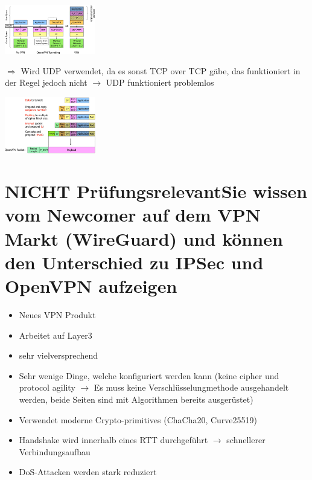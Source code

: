 \documentclass{report}
\newenvironment{Figure}
	{\par\medskip\noindent\minipage{\linewidth}}
	{\endminipage\par\medskip}
\theoremstyle{definition}
\theoremstyle{example}
\begin{document}
\begin{Figure}
\centering
\includegraphics[width=150px]{img/vpnOpenVPNTunnelMode.png}
	\label{fig:Abbildung über das Schema für VPN Tunnel Mode mittels OpenVPN}
\end{Figure}
$\Rightarrow$ Wird UDP verwendet, da es sonst TCP over TCP gäbe, das funktioniert in der Regel jedoch nicht $\rightarrow$ UDP funktioniert problemlos

\begin{Figure}
\centering
\includegraphics[width=150px]{img/vpnOpenVPN.png}
	\label{fig:Abbildung über das Schema mittels OpenVPN}
\end{Figure}


\section{NICHT PrüfungsrelevantSie wissen vom Newcomer auf dem VPN Markt (WireGuard) und können den Unterschied zu IPSec und OpenVPN aufzeigen}
\begin{itemize}
	\item Neues VPN Produkt
	\item Arbeitet auf Layer3
	\item sehr vielversprechend
	\item Sehr wenige Dinge, welche konfiguriert werden kann (keine cipher und protocol agility $\rightarrow$ Es muss keine Verschlüsselungmethode ausgehandelt werden, beide Seiten sind mit Algorithmen bereits ausgerüstet)
	\item Verwendet moderne Crypto-primitives (ChaCha20, Curve25519)
	\item Handshake wird innerhalb eines RTT durchgeführt $\rightarrow$ schnellerer Verbindungsaufbau
	\item DoS-Attacken werden stark reduziert
\end{itemize}
\end{document}
